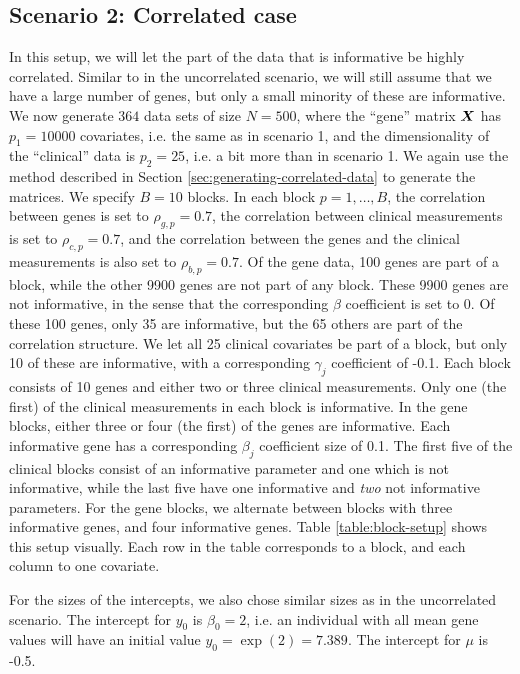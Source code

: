 \subsection{Scenario 2: Correlated case}
In this setup, we will let the part of the data that is informative be highly correlated.
Similar to in the uncorrelated scenario, we will still assume that we have a large number of genes, but only a small minority of these are informative.
We now generate $364$ data sets of size $N=500$, where the ``gene'' matrix $\bm{X}$ has $p_1=10000$ covariates, i.e. the same as in scenario 1, and the dimensionality of the ``clinical'' data is $p_2=25$, i.e. a bit more than in scenario 1.
We again use the method described in Section \ref{sec:generating-correlated-data} to generate the matrices.
We specify $B=10$ blocks.
In each block $p=1,\ldots,B$, the correlation between genes is set to $\rho_{g,p}=0.7$, the correlation between clinical measurements is set to $\rho_{c,p}=0.7$, and the correlation between the genes and the clinical measurements is also set to $\rho_{b,p}=0.7$.
Of the gene data, 100 genes are part of a block, while the other 9900 genes are not part of any block.
These 9900 genes are not informative, in the sense that the corresponding $\beta$ coefficient is set to 0.
Of these 100 genes, only 35 are informative, but the 65 others are part of the correlation structure.
We let all 25 clinical covariates be part of a block, but only 10 of these are informative, with a corresponding $\gamma_j$ coefficient of -0.1.
Each block consists of 10 genes and either two or three clinical measurements.
Only one (the first) of the clinical measurements in each block is informative.
In the gene blocks, either three or four (the first) of the genes are informative.
Each informative gene has a corresponding $\beta_j$ coefficient size of 0.1.
The first five of the clinical blocks consist of an informative parameter and one which is not informative, while the last five have one informative and \textit{two} not informative parameters.
For the gene blocks, we alternate between blocks with three informative genes, and four informative genes.
Table \ref{table:block-setup} shows this setup visually.
Each row in the table corresponds to a block, and each column to one covariate.

For the sizes of the intercepts, we also chose similar sizes as in the uncorrelated scenario.
The intercept for $y_0$ is $\beta_0=2$, i.e. an individual with all mean gene values will have an initial value $y_0=\exp(2)=7.389$.
The intercept for $\mu$ is -0.5.

